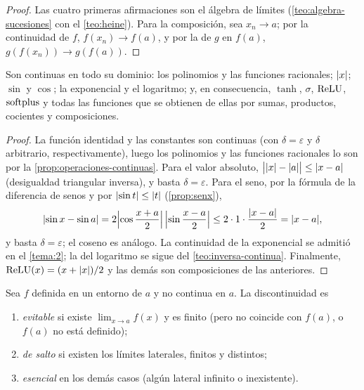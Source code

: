 \begin{proof}
Las cuatro primeras afirmaciones son el álgebra de límites (\cref{teo:algebra-sucesiones} con el \cref{teo:heine}). Para la composición, sea $x_n\to a$; por la continuidad de $f$, $f(x_n)\to f(a)$, y por la de $g$ en $f(a)$, $g(f(x_n))\to g(f(a))$.
\end{proof}

\begin{proposicion}\label{prop:elementales-continuas}
Son continuas en todo su dominio: los polinomios y las funciones racionales; $\lvert x\rvert$; $\sin$ y $\cos$; la exponencial y el logaritmo; y, en consecuencia, $\tanh$, $\sigma$, $\operatorname{ReLU}$, $\operatorname{softplus}$ y todas las funciones que se obtienen de ellas por sumas, productos, cocientes y composiciones.
\end{proposicion}

\begin{proof}
La función identidad y las constantes son continuas (con $\delta=\varepsilon$ y $\delta$ arbitrario, respectivamente), luego los polinomios y las funciones racionales lo son por la \cref{prop:operaciones-continuas}. Para el valor absoluto, $\bigl|\lvert x\rvert-\lvert a\rvert\bigr|\le\lvert x-a\rvert$ (desigualdad triangular inversa), y basta $\delta=\varepsilon$. Para el seno, por la fórmula de la diferencia de senos y por $\lvert\sin t\rvert\le\lvert t\rvert$ (\cref{prop:senx}),
\[
\lvert\sin x-\sin a\rvert=2\Bigl|\cos\frac{x+a}{2}\Bigr|\,\Bigl|\sin\frac{x-a}{2}\Bigr|\le2\cdot1\cdot\frac{\lvert x-a\rvert}{2}=\lvert x-a\rvert,
\]
y basta $\delta=\varepsilon$; el coseno es análogo. La continuidad de la exponencial se admitió en el \cref{tema:2}; la del logaritmo se sigue del \cref{teo:inversa-continua}. Finalmente, $\operatorname{ReLU}(x)=(x+\lvert x\rvert)/2$ y las demás son composiciones de las anteriores.
\end{proof}

\begin{definicion}\label{def:discontinuidades}
Sea $f$ definida en un entorno de $a$ y no continua en $a$. La discontinuidad es
\begin{enumerate}
  \item \emph{evitable} si existe $\lim_{x\to a}f(x)$ y es finito (pero no coincide con $f(a)$, o $f(a)$ no está definido);
  \item \emph{de salto} si existen los límites laterales, finitos y distintos;
  \item \emph{esencial} en los demás casos (algún lateral infinito o inexistente).
\end{enumerate}
\end{definicion}

